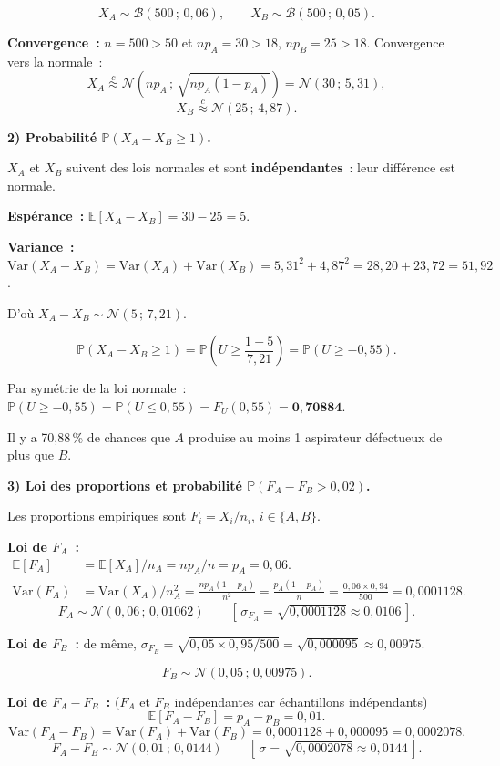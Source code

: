 \documentclass[11pt,a4paper]{article}
\newcommand{\N}{\mathcal{N}}
\newcommand{\B}{\mathcal{B}}
\newcommand{\E}{\mathbb{E}}
\newcommand{\Var}{\mathrm{Var}}
\newcommand{\Prob}{\mathbb{P}}
\newcommand{\appN}{\overset{c}{\approx}}
\renewcommand{\P}{\Prob}
\begin{document}
$$X_A \sim \B(500\,;\,0{,}06), \qquad X_B \sim \B(500\,;\,0{,}05).$$

\textbf{Convergence~:} $n=500>50$ et $np_A=30>18$, $np_B=25>18$. Convergence vers la normale~:
$$X_A \appN \N\!\left(np_A\,;\,\sqrt{np_A(1-p_A)}\right) = \N(30\,;\,5{,}31),$$
$$X_B \appN \N(25\,;\,4{,}87).$$

\medskip
\textbf{2) Probabilit\'e $\P(X_A - X_B \geq 1)$.}

$X_A$ et $X_B$ suivent des lois normales et sont \textbf{ind\'ependantes}~: leur diff\'erence est normale.

\textbf{Esp\'erance~:} $\E[X_A-X_B] = 30-25 = 5$.

\textbf{Variance~:} $\Var(X_A-X_B) = \Var(X_A)+\Var(X_B) = 5{,}31^2+4{,}87^2 = 28{,}20+23{,}72 = 51{,}92$.

D'o\`u $X_A-X_B \sim \N(5\,;\,7{,}21)$.

$$\P(X_A-X_B \geq 1) = \P\!\left(U \geq \frac{1-5}{7{,}21}\right) = \P(U \geq -0{,}55).$$

Par sym\'etrie de la loi normale~: $\P(U\geq -0{,}55) = \P(U\leq 0{,}55) = F_U(0{,}55) = \mathbf{0{,}70884}$.

Il y a 70,88\,\% de chances que $A$ produise au moins 1 aspirateur d\'efectueux de plus que $B$.

\medskip
\textbf{3) Loi des proportions et probabilit\'e $\P(F_A - F_B > 0{,}02)$.}

Les proportions empiriques sont $F_i = X_i/n_i$, $i\in\{A,B\}$.

\textbf{Loi de $F_A$~:}
\begin{align*}
\E[F_A] &= \E[X_A]/n_A = np_A/n = p_A = 0{,}06. \\
\Var(F_A) &= \Var(X_A)/n_A^2 = \frac{np_A(1-p_A)}{n^2} = \frac{p_A(1-p_A)}{n} = \frac{0{,}06\times0{,}94}{500} = 0{,}0001128.
\end{align*}
$$F_A \sim \N(0{,}06\,;\,0{,}01062) \qquad [\,\sigma_{F_A}=\sqrt{0{,}0001128}\approx 0{,}0106\,].$$

\textbf{Loi de $F_B$~:} de m\^eme, $\sigma_{F_B} = \sqrt{0{,}05\times0{,}95/500} = \sqrt{0{,}000095} \approx 0{,}00975$.

$$F_B \sim \N(0{,}05\,;\,0{,}00975).$$

\textbf{Loi de $F_A-F_B$~:} ($F_A$ et $F_B$ ind\'ependantes car \'echantillons ind\'ependants)
$$\E[F_A-F_B] = p_A-p_B = 0{,}01.$$
$$\Var(F_A-F_B) = \Var(F_A)+\Var(F_B) = 0{,}0001128+0{,}000095 = 0{,}0002078.$$
$$F_A-F_B \sim \N(0{,}01\,;\,0{,}0144) \qquad [\,\sigma=\sqrt{0{,}0002078}\approx 0{,}0144\,].$$
\end{document}
